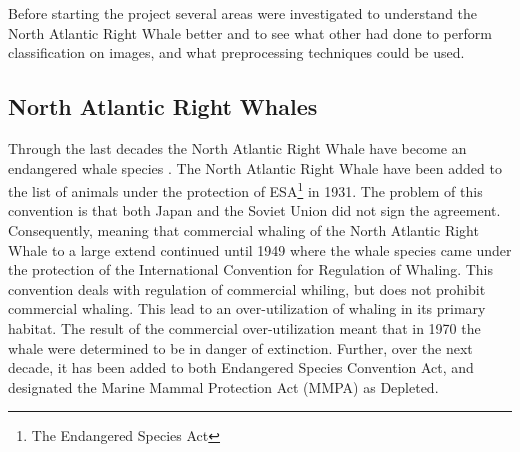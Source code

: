 Before starting the project several areas were investigated to understand the North Atlantic Right Whale better and to see what other had done to perform classification on images, and what preprocessing techniques could be used.

\subsection{North Atlantic Right Whales}
Through the last decades the North Atlantic Right Whale have become an endangered whale species \cite{NOAA}. The North Atlantic Right Whale have been added to the list of animals under the protection of ESA\footnote{The Endangered Species Act} in 1931. The problem of this convention is that both Japan and the Soviet Union did not sign the agreement. Consequently, meaning that commercial whaling of the North Atlantic Right Whale to a large extend continued until 1949 where the whale species came under the protection of the International Convention for Regulation of Whaling. 
This convention deals with regulation of commercial whiling, but does not prohibit commercial whaling. 
This lead to an over-utilization of whaling in its primary habitat. The result of the commercial over-utilization meant that in 1970 the whale were determined to be in danger of extinction. 
Further, over the next decade, it has been added to both Endangered Species Convention Act, and designated the Marine Mammal Protection Act (MMPA) as Depleted.

